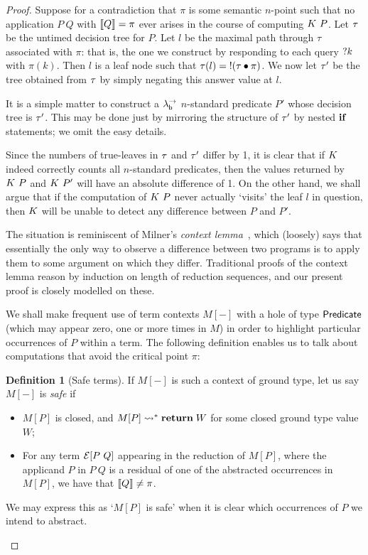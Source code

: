 \documentclass[12pt,phd,lfcs,twoside,openright,logo,leftchapter,normalheadings]{infthesis}
\theoremstyle{plain}
\theoremstyle{definition}
\newtheorem{definition}[theorem]{Definition}
\begin{document}
\begin{proof}
  Suppose for a contradiction that $\pi$ is some semantic $n$-point
  such that no application $P~Q$ with $\llbracket Q \rrbracket =\pi$ ever arises in the
  course of computing $K~P$. Let $\tau$ be the untimed
  decision tree for $P$. Let $l$ be the maximal path through $\tau$
  associated with $\pi$: that is, the one we construct by responding
  to each query $\mathord{?} k$ with $\pi(k)$. Then $l$ is a leaf node such
  that $\tau(l) = \mathord{!} (\tau \bullet \pi)$. We now let $\tau'$ be
  the tree obtained from $\tau$ by simply negating this answer value
  at $l$.

  It is a simple matter to construct a $\lambda^\rightarrow_{\mathsf{b}}$ $n$-standard predicate
  $P'$ whose decision tree is $\tau'$. This may be done just by
  mirroring the structure of $\tau'$ by nested $\mathbf{if}$ statements; we
  omit the easy details.

  Since the numbers of true-leaves in $\tau$ and $\tau'$ differ by
  1, it is clear that if $K$ indeed correctly counts all
  $n$-standard predicates, then the values returned by $K~P$
  and $K~P'$ will have an absolute difference of 1.  On the
  other hand, we shall argue that if the computation of $K~P$
  never actually `visits' the leaf $l$ in question, then $K$
  will be unable to detect any difference between $P$ and $P'$.

  The situation is reminiscent of Milner's \emph{context
    lemma}~\citep{Milner77}, which (loosely) says that essentially the
  only way to observe a difference between two programs is to apply
  them to some argument on which they differ.  Traditional proofs of
  the context lemma reason by induction on length of reduction
  sequences, and our present proof is closely modelled on these.

  We shall make frequent use of term contexts $M[-]$ with a hole of
  type $\mathsf{Predicate}$ (which may appear zero, one or more times in $M$)
  in order to highlight particular occurrences of $P$ within a term.
  The following definition enables us to talk about computations that
  avoid the critical point $\pi$:

  \begin{definition}[Safe terms]\label{def:safe}
  If $M[-]$ is such a context of ground type, let us say $M[-]$ is \emph{safe} if
  \begin{itemize}
    \item $M[P]$ is closed, and $M[P] \leadsto^\ast \mathbf{return}\;W$ for some closed
    ground type value $W$;
    \item For any term $\mathcal{E}[P~Q]$ appearing in the reduction of $M[P]$, where the
    applicand $P$ in $P~Q$ is a residual of one of the abstracted occurrences in $M[P]$,
    we have that $\llbracket Q \rrbracket \neq \pi$.
  \end{itemize}
  We may express this as `$M[P]$ is safe' when it is clear which occurrences of $P$
  we intend to abstract.
  \end{definition}


\end{proof}
\end{document}
